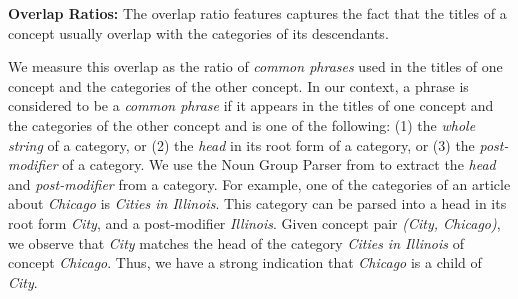 {\bf Overlap Ratios:} The overlap ratio features captures the fact
that the titles of a concept usually overlap with the categories of
its descendants.    We measure this
overlap as the ratio of {\em common phrases} used in the titles of one
concept and the categories of the other concept. In our context, a
phrase is considered to be a {\em common phrase} if it appears in the
titles of one concept and the categories of the other concept and is
one of the following: (1) the {\em whole string} of a category, or (2)
the {\em head} in its root form of a category, or (3) the {\em
  post-modifier} of a category. We use the Noun Group Parser from
\cite{suchanek2007WWW} to extract the {\em head} and {\em
  post-modifier} from a category. For example, one of the categories
of an article about \emph{Chicago} is \emph{Cities in Illinois}. This
category can be parsed into a head in its root form \emph{City}, and a
post-modifier \emph{Illinois}. Given concept pair \emph{(City,
  Chicago)}, we observe that \emph{City} matches the head of the
category {\em Cities in Illinois} of concept {\em Chicago}. Thus, we
have a strong indication that {\em Chicago} is a child of {\em City}.




